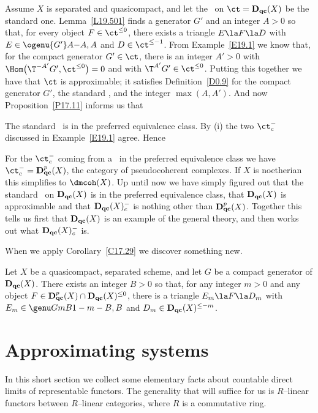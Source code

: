 \documentclass[11pt]{amsart}
\newcommand{\Dqc}{{\mathbf D_{\text{\bf qc}}}}
\newcommand{\Dqcp}{{\mathbf D_{\text{\bf qc}}^p}}
\begin{document}
Assume $X$ is separated and quasicompact,
and let the \tstr\ on $\ct=\Dqc(X)$ be the standard one.
Lemma~\ref{L19.501} finds a generator $G'$ and
an integer $A>0$ so that, for every object $F\in\ct^{\leq0}$, there exists
a triangle $E\la F\la D$ with $E\in\ogenu {G'}A{-A,A}$ and $D\in\ct^{\leq-1}$.
From Example~\ref{E19.1} we know that, for the compact generator $G'\in\ct$,
there is an integer $A'>0$ with $\Hom\big(\T^{-A'}G',\ct^{\leq0}\big)=0$ and with
$\T^{A'}G'\in\ct^{\leq0}$. 
Putting this together we have that $\ct$ is approximable; it
satisfies
Definition~\ref{D0.9} for
the compact generator $G'$, the standard \tstr, and the integer $\max(A,A')$.
And now Proposition~\ref{P17.11}
informs us that
\be
\item
The standard \tstr\ is in the preferred
equivalence class.
\setcounter{enumiv}{\value{enumi}}
\ee
By (i) the two $\ct^-_c$ discussed in Example~\ref{E19.1} agree. Hence
\be
\setcounter{enumi}{\value{enumiv}}
\item
  For the $\ct^-_c$ coming from a \tstr\ in the
  preferred equivalence class we have
  $\ct^-_c=\Dqcp(X)$, the category of pseudocoherent complexes.
  If $X$ is noetherian this simplifies to $\dmcoh(X)$.
\setcounter{enumiv}{\value{enumi}}
\ee
Up until now we have simply figured out that the standard \tstr\
on $\Dqc(X)$ is
in the preferred equivalence class, that $\Dqc(X)$ is approximable
and that $\Dqc(X)^-_c$ is nothing other than $\Dqcp(X)$.
Together this tells us first that $\Dqc(X)$ is an example of
the general theory, and then works out what $\Dqc(X)^-_c$ is.

When we apply Corollary~\ref{C17.29} we discover something new.
\be
\setcounter{enumi}{\value{enumiv}}
\item
  Let $X$ be a quasicompact, separated scheme,
  and let $G$ be a compact generator of $\Dqc(X)$.
There exists
 an integer $B>0$ so that, for any
 integer $m>0$ and any
object $F\in\Dqcp(X)\cap\Dqc(X)^{\leq0}$,
there is a triangle $E_m\la F\la D_m$ with
$E_m\in\genu G{mB}{1-m-B,B}$ and
$D_m\in\Dqc(X)^{\leq-m}$.
\setcounter{enumiv}{\value{enumi}}
\ee
\eexm





\section{Approximating systems}
\label{S27}

In this short section we collect some elementary facts about
countable direct limits of representable functors. The
generality that will suffice for us is $R$--linear functors
between $R$--linear categories, where $R$ is a commutative ring.
\end{document}
